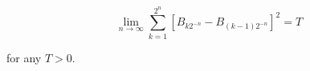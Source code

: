 $$\lim_{n \to \infty} \sum_{k=1}^{2^n} \left[ B_{k2^{-n}} - B_{(k-1)2^{-n}} \right]^2 = T$$

for any $T > 0$.
